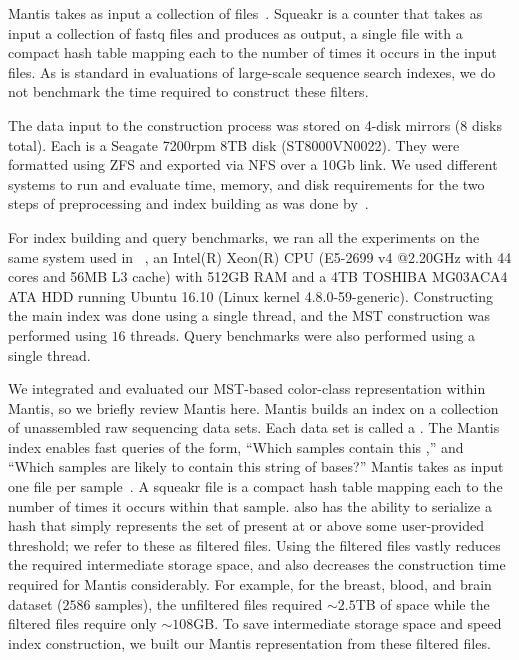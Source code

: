 Mantis takes as input a collection of  files~\cite{PandeyBeJo17}.
Squeakr is a \kmer counter that takes as input a collection of fastq
files and produces as output, a single file with a compact hash table
mapping each \kmer to the number of times it occurs in the input
files.  As is standard in evaluations of large-scale sequence search indexes,
we do not benchmark the time required to construct these filters.

The data input to the construction process
was stored on 4-disk mirrors (8 disks
total).  Each is a Seagate 7200rpm 8TB disk (ST8000VN0022). They were formatted
using ZFS and exported via NFS over a 10Gb link.
We used different systems to run and evaluate time, memory,
and disk requirements for the two steps of preprocessing and
index building as was done by~\citet{mantis}.

For index building and query benchmarks, we ran all the experiments on
the same system used in \prevsys~\citep{mantis}, an
Intel(R) Xeon(R) CPU (E5-2699 v4 @2.20GHz with 44 cores and 56MB L3 cache) with
512GB RAM and a 4TB TOSHIBA MG03ACA4 ATA HDD running Ubuntu 16.10 (Linux kernel
4.8.0-59-generic).  Constructing the main index was done using a single thread,
and the MST construction was performed using $16$ threads.  Query benchmarks
were also performed using a single thread.


We integrated and evaluated our MST-based color-class representation
within Mantis, so we briefly review Mantis here. Mantis builds an index on a
collection of unassembled raw sequencing data sets. Each data set is called a
. The Mantis index enables fast queries of the form, ``Which
samples contain this \kmer,'' and ``Which samples are likely to contain this
string of bases?'' Mantis takes as input one  file per
sample~\cite{PandeyBeJo17}. A squeakr file is a compact hash table mapping each
\kmer to the number of times it occurs within that sample. \squeakr also has the
ability to serialize a hash that simply represents the set of \kmers present at
or above some user-provided threshold; we refer to these as filtered \squeakr
files. Using the filtered \squeakr files vastly reduces the required
intermediate storage space, and also decreases the construction time required
for Mantis considerably. For example, for the breast, blood, and brain dataset
($2586$ samples), the unfiltered \squeakr files required $\sim2.5$TB of space
while the filtered files require only $\sim108$GB. To save intermediate storage
space and speed index construction, we built our Mantis representation from
these filtered \squeakr files.


